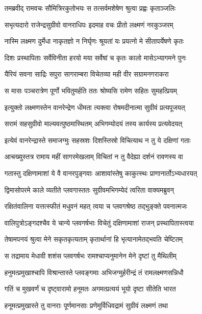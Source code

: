 \twolineshloka
{तमब्रवीद् रामवचः सौमित्रिरकुतोभयः}
{स तत्सर्वमशेषेण श्रुत्वा प्रह्वः कृताञ्जलिः}


\twolineshloka
{सभृत्यदारो राजेन्द्रसुग्रीवो वानराधिपः}
{इदमाह वचः प्रीतो लक्ष्मणं नरकुञ्जरम्}


\twolineshloka
{नास्मि लक्ष्मण दुर्मेधा नाकृतज्ञो न निर्घृणः}
{श्रूयतां यः प्रयत्नो मे सीतापर्येषणे कृतः}


\twolineshloka
{दिशः प्रस्थापिताः सर्वेविनीता हरयो मया}
{सर्वेषां च कृतः कालो मासेऽभ्यागमने पुनः}


\twolineshloka
{यैरियं सवना साद्रिः सपुरा सागराम्बरा}
{विचेतव्या मही वीर सग्रामनगराकरा}


\twolineshloka
{स मासः पञ्चरात्रेण पूर्णो भवितुमर्हति}
{ततः श्रोष्यसि रामेण सहितः सुमहत्प्रियम्}


\twolineshloka
{इत्युक्तो लक्ष्मणस्तेन वानरेन्द्रेण धीमता}
{त्यक्त्वा रोषमदीनात्मा सुग्रीवं प्रत्यपूजयत्}


\twolineshloka
{सरामं सहसुग्रीवो माल्यवत्पुष्ठमास्थितम्}
{अभिगम्योदयं तस्य कार्यस्य प्रत्यवेदयत्}


\twolineshloka
{इत्येवं वानरेन्द्रास्ते समाजग्मुः सहस्रशः}
{दिशस्तिस्रो विचित्याथ न तु ये दक्षिणां गताः}


\twolineshloka
{आचख्युस्तत्र रामाय महीं सागरमेखलाम्}
{विचितां न तु वैदेह्या दर्शनं रावणस्य वा}


\twolineshloka
{गतास्तु दक्षिणामाशां ये वै वानरपुङ्गवाः}
{आशावांस्तेषु काकुत्स्थः प्राणानार्तोऽभ्यधारयत्}


\twolineshloka
{द्विमासोपरमे काले व्यतीते प्लवगास्ततः}
{सुग्रीवमभिगम्येदं त्वरिता वाक्यमब्रुवन्}


\twolineshloka
{रक्षितंवालिना यत्तत्स्फीतं मधुवनं महत्}
{त्वया च प्लवगश्रेष्ठ तद्भुङ्क्ते पवनात्मजः}


\twolineshloka
{वालिपुत्रोऽङ्गदश्चैव ये चान्ये प्लवगर्षभाः}
{विचेतुं दक्षिणामाशां राजन् प्रस्थापितास्त्वया}


\twolineshloka
{तेषामपनयं श्रुत्वा मेने सकृतकृत्यताम्}
{कृतार्थानां हि भृत्यानामेतद्भवति चेष्टितम्}


\twolineshloka
{स तद्रामाय मेधावी शशंस प्लवगर्षभः}
{रामश्चाप्यनुमानेन मेने दृष्टां तु मैथिलीम्}


\twolineshloka
{हनुमत्प्रमुखाश्चापि विश्रान्तास्ते प्लवङ्गमाः}
{अभिजग्मुर्हरीन्द्रं तं रामलक्ष्मणसन्निधौ}


\twolineshloka
{गतिं च मुखवर्णं च दृष्ट्वारामो हनूमतः}
{अगमत्प्रत्ययं भूयो दृष्टा सीतेति भारत}


\twolineshloka
{हनूमत्प्रमुखास्ते तु वानराः पूर्णमानसाः}
{प्रणेमुर्विधिवद्रामं सुग्रीवं लक्ष्मणं तथा}



